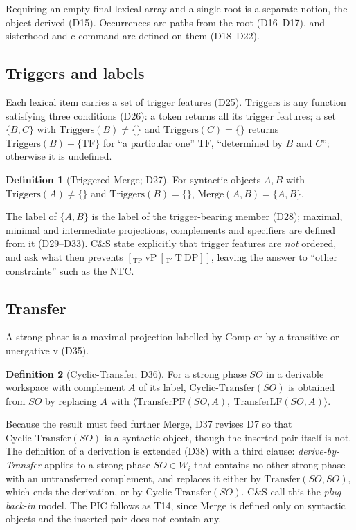 \documentclass[11pt]{article}
\newcommand{\Def}[1]{D#1}
\newcommand{\Thm}[1]{T#1}
\newcommand{\Merge}{\mathrm{Merge}}
\newcommand{\Triggers}{\mathrm{Triggers}}
\newcommand{\TPF}{\mathrm{TransferPF}}
\newcommand{\TLF}{\mathrm{TransferLF}}
\newcommand{\CT}{\mathrm{Cyclic\text{-}Transfer}}
\newcommand{\pair}[1]{\langle #1 \rangle}
\theoremstyle{definition}
\newtheorem{definition}{Definition}
\theoremstyle{plain}
\begin{document}
\noindent
Requiring an empty final lexical array and a single root is a separate
notion, the object derived (\Def{15}). Occurrences are paths from the root
(\Def{16}--\Def{17}), and sisterhood and c-command are defined on them
(\Def{18}--\Def{22}).

\subsection{Triggers and labels}

Each lexical item carries a set of trigger features (\Def{25}).
$\Triggers$ is any function satisfying three conditions (\Def{26}): a token
returns all its trigger features; a set $\{B,C\}$ with $\Triggers(B)\neq\{\}$
and $\Triggers(C)=\{\}$ returns $\Triggers(B)-\{\mathrm{TF}\}$ for
``a particular one'' $\mathrm{TF}$, ``determined by $B$ and $C$''; otherwise it
is undefined.

\begin{definition}[Triggered Merge; \Def{27}]
For syntactic objects $A,B$ with $\Triggers(A)\neq\{\}$ and
$\Triggers(B)=\{\}$, $\Merge(A,B)=\{A,B\}$.
\end{definition}

\noindent
The label of $\{A,B\}$ is the label of the trigger-bearing member
(\Def{28}); maximal, minimal and intermediate projections, complements and
specifiers are defined from it (\Def{29}--\Def{33}). C\&S state explicitly
that trigger features are \emph{not} ordered, and ask what then prevents
$[_{\mathrm{TP}}\ \mathrm{vP}\ [_{\mathrm{T'}}\ \mathrm{T}\ \mathrm{DP}]]$,
leaving the answer to ``other constraints'' such as the NTC.

\subsection{Transfer}

A strong phase is a maximal projection labelled by Comp or by a transitive or
unergative v (\Def{35}).

\begin{definition}[Cyclic-Transfer; \Def{36}]
For a strong phase $SO$ in a derivable workspace with complement $A$ of its
label, $\CT(SO)$ is obtained from $SO$ by replacing $A$ with
$\pair{\TPF(SO,A),\ \TLF(SO,A)}$.
\end{definition}

\noindent
Because the result must feed further Merge, \Def{37} revises \Def{7} so that
$\CT(SO)$ is a syntactic object, though the inserted pair itself is not. The
definition of a derivation is extended (\Def{38}) with a third clause:
\emph{derive-by-Transfer} applies to a strong phase $SO\in W_i$ that contains
no other strong phase with an untransferred complement, and replaces it either
by $\mathrm{Transfer}(SO,SO)$, which ends the derivation, or by $\CT(SO)$.
C\&S call this the \emph{plug-back-in} model. The PIC follows as \Thm{14},
since Merge is defined only on syntactic objects and the inserted pair does
not contain any.
\end{document}
